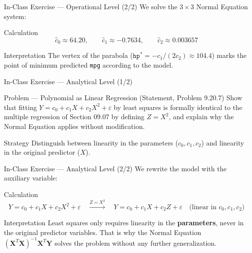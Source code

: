 \documentclass[10pt, aspectratio=169]{beamer}
\begin{document}
\begin{frame}{In-Class Exercise --- Operational Level (2/2)}
  \scriptsize
  We solve the $3\times3$ Normal Equation system: \pause

  \vspace{0.05cm}
  \begin{block}{Calculation}
    $$\hat c_0\approx64.20, \qquad \hat c_1\approx-0.7634, \qquad \hat c_2\approx0.003657$$
  \end{block}

  \vspace{0.05cm}
  \pause
  \begin{alertblock}{Interpretation}
    The vertex of the parabola ($\texttt{hp}^*=-c_1/(2c_2)\approx104.4$) marks the point of minimum predicted \texttt{mpg} according to the model.
  \end{alertblock}
\end{frame}

\begin{frame}{In-Class Exercise --- Analytical Level (1/2)}
  \footnotesize
  \begin{block}{Problem --- Polynomial as Linear Regression (Statement, Problem 9.20.7)}
    Show that fitting $Y=c_0+c_1X+c_2X^2+\varepsilon$ by least squares is formally identical to the multiple regression of Section 09.07 by defining $Z=X^2$, and explain why the Normal Equation applies without modification.
  \end{block}

  \vspace{0.1cm}
  \pause
  \begin{alertblock}{Strategy}
    Distinguish between linearity in the parameters ($c_0,c_1,c_2$) and linearity in the original predictor ($X$).
  \end{alertblock}
\end{frame}

\begin{frame}{In-Class Exercise --- Analytical Level (2/2)}
  \scriptsize
  We rewrite the model with the auxiliary variable: \pause

  \vspace{0.05cm}
  \begin{block}{Calculation}
    \scriptsize
    $$Y=c_0+c_1X+c_2X^2+\varepsilon \quad \xrightarrow{Z=X^2} \quad Y=c_0+c_1X+c_2Z+\varepsilon \quad \text{(linear in } c_0,c_1,c_2\text{)}$$
  \end{block}

  \vspace{0.05cm}
  \pause
  \begin{alertblock}{Interpretation}
    Least squares only requires linearity in the \textbf{parameters}, never in the original predictor variables. That is why the Normal Equation $(\mathbf{X}^T\mathbf{X})^{-1}\mathbf{X}^T\mathbf{Y}$ solves the problem without any further generalization.
  \end{alertblock}
\end{frame}
\end{document}
